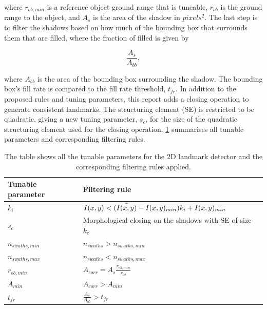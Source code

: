 where $r_{ob, min}$ is a reference object ground range that is tuneable, $r_{ob}$ is the ground range to the object, and $A_s$ is the area of the shadow in $pixels^2$. The last step is to filter the shadows based on how much of the bounding box that surrounds them that are filled, where the fraction of filled is given by

\begin{equation}
    \frac{A_s}{A_{bb}},
    \label{eq:fill_rate_bb}
\end{equation}

where $A_{bb}$ is the area of the bounding box surrounding the shadow. The bounding box's fill rate is compared to the fill rate threshold, $t_{fr}$. In addition to the proposed rules and tuning parameters, this report adds a closing operation to generate consistent landmarks. The structuring element (SE) is restricted to be quadratic, giving a new tuning parameter, $s_c$, for the size of the quadratic structuring element used for the closing operation. \cref{tab:2D_tuning_rules} summarises all tunable parameters and corresponding filtering rules. 

\begin{table}
    \begin{center}
    \caption{The table shows all the tunable parameters for the 2D landmark detector and the corresponding filtering rules applied.}
    \begin{tabular}{ll}
        \hline
        \textbf{Tunable parameter} & \textbf{Filtering rule}                            \\ \hline
        $k_i$             & $I(x,y) < (\Bar{I(x,y)} - I(x,y)_{min}) k_i + I(x,y)_{min}$ \\ 
        $s_c$             & Morphological closing on the shadows with SE of size $k_c$  \\ 
        $n_{swaths,min}$  & $n_{swaths} > n_{swaths,min}$                               \\ 
        $n_{swaths,max}$  & $n_{swaths} < n_{swaths,max}$                               \\ 
        $r_{ob,min}$      & $A_{corr} = A_s\frac{r_{ob,min}}{r_{ob}}$           \\ 
        $A_{min}$         & $A_{corr} > A_{min}$                                        \\ 
        $t_{fr}$          & $\frac{A_s}{A_{bb}} > t_{fr}$                               \\ 
        \hline
    \end{tabular}
    \end{center}
    \label{tab:2D_tuning_rules}
\end{table}

